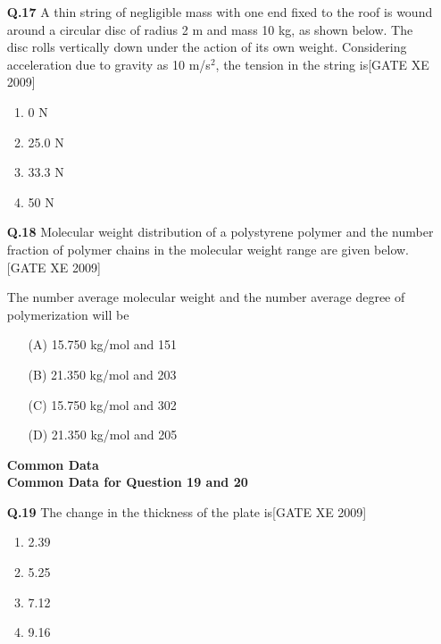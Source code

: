 \documentclass[journal,12pt,onecolumn]{IEEEtran}
\theoremstyle{remark}
\begin{document}
\begin{enumerate}
\begin{enumerate}
\vspace{0.3cm}

\item[\textbf{Q.17}] A thin string of negligible mass with one end fixed to the roof is wound around a circular disc of radius 2 m and mass 10 kg, as shown below. The disc rolls vertically down under the action of its own weight. Considering acceleration due to gravity as 10 m/s$^2$, the tension in the string is\hfill[GATE XE 2009]

\begin{multicols}{2}
\begin{enumerate}
    \item 0 N
    \item 25.0 N
    \item 33.3 N
    \item 50 N
\end{enumerate}
\end{multicols}

\item[\textbf{Q.18}]{Molecular weight distribution of a polystyrene polymer and the number fraction of polymer chains in the molecular weight range are given below.}\hfill[GATE XE 2009]



\vspace{1em}

The number average molecular weight and the number average degree of polymerization will be

\begin{itemize}
    \item[(A)] 15.750 kg/mol and 151
    \item[(B)] 21.350 kg/mol and 203
    \item[(C)] 15.750 kg/mol and 302
    \item[(D)] 21.350 kg/mol and 205
\end{itemize} 

{\Large \textbf{{Common Data}}}\\
\textbf{Common Data for Question 19 and 20}
\item [\textbf{Q.19}] The change in the thickness of the plate is\hfill[GATE XE 2009]
\begin{multicols}{2}
\begin{enumerate}
    \item 2.39 
    \item 5.25 
    \item 7.12 
    \item 9.16 
\end{enumerate}
\end{multicols}


\end{enumerate}
\end{enumerate}
\end{document}
